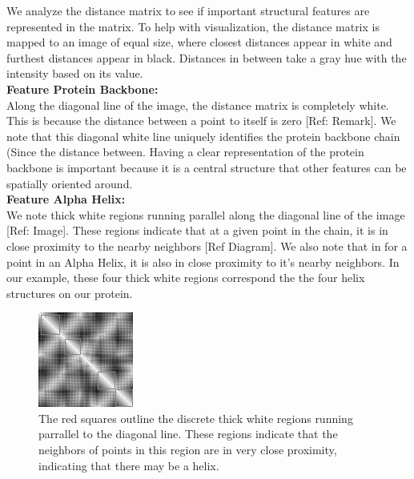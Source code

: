 \documentclass[12pt, a4paper, twocolumn, fullpage]{article}
\theoremstyle{plain}
\theoremstyle{definition}
\theoremstyle{remark}
\begin{document}
We analyze the distance matrix to see if important structural features are represented in the matrix. To help with visualization, the distance matrix is mapped to an image of equal size, where closest distances appear in white and furthest distances appear in black. Distances in between take a gray hue with the intensity based on its value.
\\

\noindent
\textbf{Feature Protein Backbone:}\\
Along the diagonal line of the image, the distance matrix is completely white. This is because the distance between a point to itself is zero [Ref: Remark]. We note that this diagonal white line uniquely identifies the protein backbone chain (Since the distance between. Having a clear representation of the protein backbone is important because  it is a central structure that other features can be spatially oriented around.
\\

\noindent
\textbf{Feature Alpha Helix:}\\
We note thick white regions running parallel along the diagonal line of the image [Ref: Image]. These regions indicate that at a given point in the chain, it is in close proximity to the nearby neighbors [Ref Diagram]. We also note that in for a point in an Alpha Helix, it is also in close proximity to it's nearby neighbors. In our example, these four thick white regions correspond the the four helix structures on our protein.
    
\begin{figure}[h]
    \centering
    \includegraphics[width=\linewidth]{1ux8matAhelix}
    \caption{The red squares outline the discrete thick white regions running parrallel to the diagonal line. These regions indicate that the neighbors of points in this region are in very close proximity, indicating that there may be a helix. }
    \label{1ux8matAhelix}
\end{figure}
\end{document}
